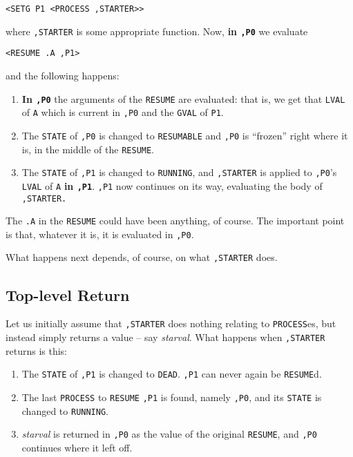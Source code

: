 \documentclass[a4paper]{scrbook}
\providecommand{\tightlist}{%
  \setlength{\itemsep}{0pt}\setlength{\parskip}{0pt}}
\begin{document}
\begin{verbatim}
<SETG P1 <PROCESS ,STARTER>>
\end{verbatim}

where \texttt{,STARTER} is some appropriate function. Now, \textbf{in \texttt{,P0}} we evaluate

\begin{verbatim}
<RESUME .A ,P1>
\end{verbatim}

and the following happens:

\begin{enumerate}
\def\labelenumi{\arabic{enumi}.}
\tightlist
\item
  \textbf{In \texttt{,P0}} the arguments of the \texttt{RESUME} are evaluated: that is, we get that \texttt{LVAL} of
  \texttt{A} which is current in \texttt{,P0} and the \texttt{GVAL} of \texttt{P1}.
\item
  The \texttt{STATE} of \texttt{,P0} is changed to \texttt{RESUMABLE} and \texttt{,P0} is ``frozen'' right where it is, in
  the middle of the \texttt{RESUME}.
\item
  The \texttt{STATE} of \texttt{,P1} is changed to \texttt{RUNNING}, and \texttt{,STARTER} is applied to \texttt{,P0}'s
  \texttt{LVAL} of \texttt{A} \textbf{in \texttt{,P1}}. \texttt{,P1} now continues on its way, evaluating the body of
  \texttt{,STARTER.}
\end{enumerate}

The \texttt{.A} in the \texttt{RESUME} could have been anything, of course. The important point is that, whatever it is, it
is evaluated in \texttt{,P0}.

What happens next depends, of course, on what \texttt{,STARTER} does.

\subsection{Top-level Return}\label{top-level-return}

Let us initially assume that \texttt{,STARTER} does nothing relating to \texttt{PROCESS}es, but instead simply returns a
value -- say \emph{starval}. What happens when \texttt{,STARTER} returns is this:

\begin{enumerate}
\def\labelenumi{\arabic{enumi}.}
\tightlist
\item
  The \texttt{STATE} of \texttt{,P1} is changed to \texttt{DEAD}. \texttt{,P1} can never again be \texttt{RESUME}d.
\item
  The last \texttt{PROCESS} to \texttt{RESUME} \texttt{,P1} is found, namely \texttt{,P0}, and its \texttt{STATE} is
  changed to \texttt{RUNNING}.
\item
  \emph{starval} is returned in \texttt{,P0} as the value of the original \texttt{RESUME}, and \texttt{,P0} continues where
  it left off.
\end{enumerate}
\end{document}
